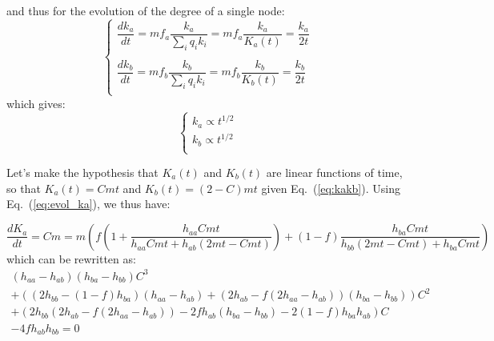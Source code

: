 \normalsize
and thus for the evolution of the degree of a single node:
\small
\begin{equation}
\left\{
  \begin{array}{l}
    \dfrac{dk_a}{dt} = mf_a\dfrac{k_a}{\sum_i q_ik_i} = mf_a\dfrac{k_a}{K_a(t)} = \dfrac{k_a}{2t}\\
    \\
    \dfrac{dk_b}{dt} = mf_b\dfrac{k_b}{\sum_i q_ik_i} = mf_b\dfrac{k_b}{K_b(t)} = \dfrac{k_b}{2t}\\
  \end{array}
\right.
\end{equation}
\normalsize
which gives:
\begin{equation}
\left\{
  \begin{array}{l}
    k_a \propto t^{1/2}\\
    k_b \propto t^{1/2}\\
  \end{array}
\right.
\end{equation}
\normalsize

Let's make the hypothesis that $K_a(t)$ and $K_b(t)$ are linear functions of time, so that $K_a(t) = Cmt$ and $K_b(t) = (2-C)mt$ given Eq.~(\ref{eq:kakb}). Using Eq.~(\ref{eq:evol_ka}), we thus have:
\small
\begin{widetext}
\begin{equation}
    \dfrac{dK_a}{dt} = Cm = m\left(f\left(1 + \dfrac{h_{aa}Cmt}{h_{aa}Cmt + h_{ab}(2mt - Cmt)}\right) + (1-f)\dfrac{h_{ba}Cmt}{h_{bb}(2mt - Cmt) + h_{ba}Cmt}\right)
\end{equation}
\normalsize
which can be rewritten as:
\begin{equation}\label{eq:C}
\begin{split}
  (h_{aa} - h_{ab})(h_{ba} - h_{bb})C^3 \\
  + ((2h_{bb} - (1-f)h_{ba})(h_{aa} - h_{ab}) + (2h_{ab} - f(2h_{aa} - h_{ab}))(h_{ba} - h_{bb}))C^2 \\
  + (2h_{bb}(2h_{ab} - f(2h_{aa} - h_{ab})) - 2fh_{ab}(h_{ba} - h_{bb}) - 2(1-f)h_{ba}h_{ab})C \\
  - 4fh_{ab}h_{bb} = 0
\end{split}
\end{equation}
\end{widetext}



